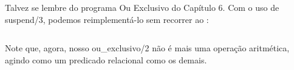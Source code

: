 \documentclass{article}
\begin{document}
Talvez se lembre do programa Ou Exclusivo do Capítulo 6. Com o uso de suspend/3, podemos reimplementá-lo sem recorrer ao :
\vspace{3cm}

\inputminted{prolog}{../Exemplos/Cap8/prog7_xor.pl}

Note que, agora, nosso ou\_exclusivo/2 não é mais uma operação aritmética, agindo como um predicado relacional como os demais.


\end{document}

